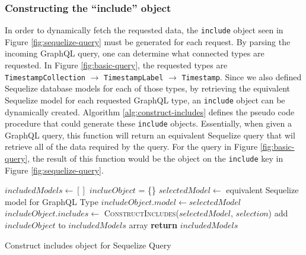 \subsubsection{Constructing the ``include'' object}
In order to dynamically fetch the requested data, the \verb!include! object seen in Figure \ref{fig:sequelize-query} must be generated for each request.  By parsing the incoming GraphQL query, one can determine what connected types are requested.  In Figure \ref{fig:basic-query}, the requested types are \verb!TimestampCollection! $\rightarrow$ \verb!TimestampLabel! $\rightarrow$ \Verb!Timestamp!.  Since we also defined Sequelize database models for each of those types, by retrieving the equivalent Sequelize model for each requested GraphQL type, an \verb!include! object can be dynamically created. Algorithm \ref{alg:construct-includes} defines the pseudo code procedure that could generate these \verb!include! objects.  Essentially, when given a GraphQL query, this function will return an equivalent Sequelize query that wil retrieve all of the data required by the query. For the query in Figure \ref{fig:basic-query}, the result of this function would be the object on the \verb!include! key in Figure \ref{fig:sequelize-query}.

\begin{algorithm}[H]
    \begin{algorithmic}
            \State $includedModels \leftarrow []$
                \State $inclueObject$ = \{\}
                    \State $selectedModel \leftarrow$ equivalent Sequelize model for GraphQL Type
                    \State $includeObject.model \leftarrow selectedModel$
                    \State $includeObject.includes \leftarrow$ 
                    \State \textsc{  ConstructIncludes}($selectedModel$, $selection$)
                    \State add $includeObject$ to $includedModels$ array
                \EndIf
            \EndFor
            \State \textbf{return} $includedModels$
        \EndProcedure
    \end{algorithmic}
    \caption{Construct includes object for Sequelize Query}
    \label{alg:construct-includes}
\end{algorithm}
